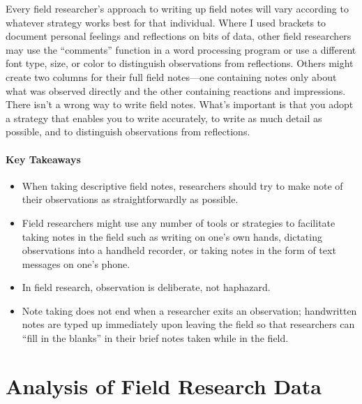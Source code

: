 Every field researcher’s approach to writing up field notes will vary according to whatever strategy works best for that individual. Where I used brackets to document personal feelings and reflections on bits of data, other field researchers may use the “comments” function in a word processing program or use a different font type, size, or color to distinguish observations from reflections. Others might create two columns for their full field notes—one containing notes only about what was observed directly and the other containing reactions and impressions. There isn’t a wrong way to write field notes. What’s important is that you adopt a strategy that enables you to write accurately, to write as much detail as possible, and to distinguish observations from reflections.

\paragraph{Key Takeaways}

\begin{itemize}
	\setlength{\itemsep}{0pt}
	\setlength{\parskip}{0pt}
	\setlength{\parsep}{0pt}
	
	\item When taking descriptive field notes, researchers should try to make note of their observations as straightforwardly as possible.
	\item Field researchers might use any number of tools or strategies to facilitate taking notes in the field such as writing on one’s own hands, dictating observations into a handheld recorder, or taking notes in the form of text messages on one’s phone.
	\item In field research, observation is deliberate, not haphazard.
	\item Note taking does not end when a researcher exits an observation; handwritten notes are typed up immediately upon leaving the field so that researchers can “fill in the blanks” in their brief notes taken while in the field.
	
\end{itemize}

\section{Analysis of Field Research Data}


